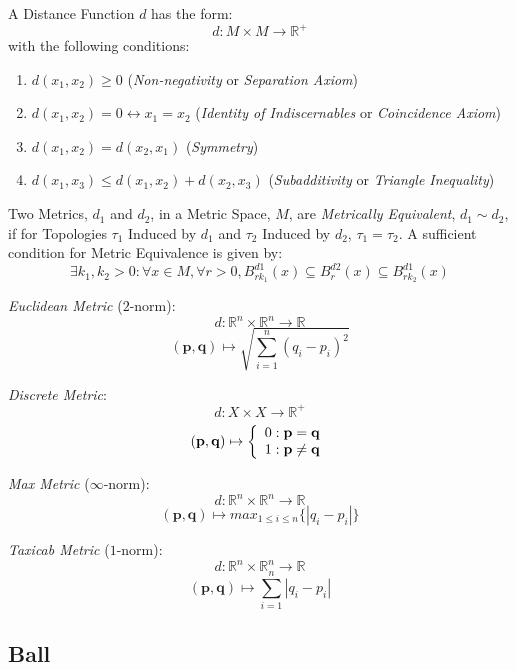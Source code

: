 A Distance Function $d$ has the form:
\[
  d: M \times M \rightarrow \mathbb{R}^{+}
\]
with the following conditions:
\begin{enumerate}
\item $d(x_1, x_2) \geq 0$ (\emph{Non-negativity} or \emph{Separation
  Axiom})
\item $d(x_1, x_2) = 0 \leftrightarrow x_1 = x_2$ (\emph{Identity of
  Indiscernables} or \emph{Coincidence Axiom})
\item $d(x_1, x_2) = d(x_2, x_1)$ (\emph{Symmetry})
\item $d(x_1, x_3) \leq d(x_1, x_2) + d(x_2, x_3)$
  (\emph{Subadditivity} or \emph{Triangle Inequality})
\end{enumerate}
Two Metrics, $d_1$ and $d_2$, in a Metric Space, $M$, are
\emph{Metrically Equivalent}, $d_1 \sim d_2$, if for Topologies
$\tau_1$ Induced by $d_1$ and $\tau_2$ Induced by $d_2$, $\tau_1 =
\tau_2$. A sufficient condition for Metric Equivalence is given by:
\[
  \exists k_1, k_2 > 0 : \forall x \in M, \forall r > 0,
  B^{d1}_{rk_1}(x) \subseteq B^{d2}_r (x) \subseteq B^{d1}_{rk_2}(x)
\]

\emph{Euclidean Metric} ($2$-norm):
\[
  d: \mathbb{R}^n \times \mathbb{R}^n \rightarrow \mathbb{R}
\]\[
  (\mathbf{p},\mathbf{q}) \mapsto \sqrt{\sum_{i=1}^{n}(q_i - p_i)^2}
\]

\emph{Discrete Metric}:
\[
  d: X \times X \rightarrow \mathbb{R}^{+}
\]\[
  (\mathbf{p},\mathbf{q}) \mapsto \left\{
  \begin{array}{l l}
    0: \mathbf{p} = \mathbf{q}\\
    1: \mathbf{p} \neq \mathbf{q}
  \end{array}\right.
\]

\emph{Max Metric} ($\infty$-norm):
\[
  d: \mathbb{R}^n \times \mathbb{R}^n \rightarrow \mathbb{R}
\]\[
  (\mathbf{p},\mathbf{q}) \mapsto max_{1 \leq i \leq n}\{|q_i - p_i|\}
\]

\emph{Taxicab Metric} ($1$-norm):
\[
  d: \mathbb{R}^n \times \mathbb{R}^n \rightarrow \mathbb{R}
\]\[
  (\mathbf{p},\mathbf{q}) \mapsto \sum_{i=1}^{n}|q_i - p_i|
\]



\subsection{Ball}\label{sec:ball}

